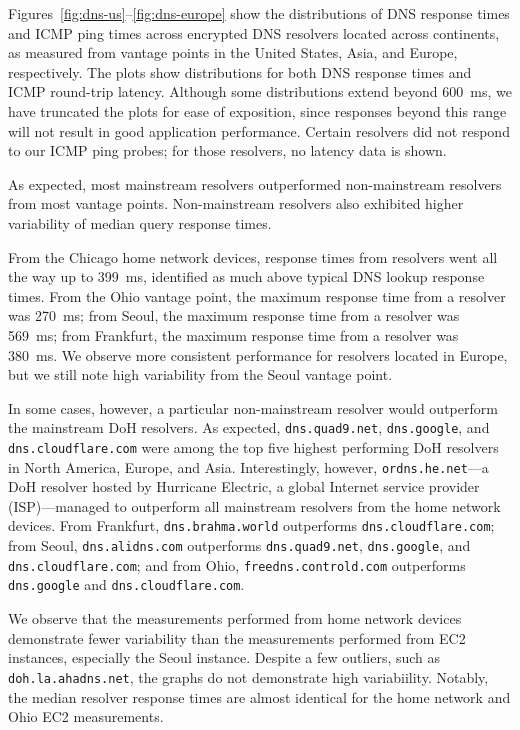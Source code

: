 Figures~\ref{fig:dns-us}--\ref{fig:dns-europe} show the distributions of DNS
response times and ICMP ping times across encrypted DNS resolvers located across continents, as measured
from vantage points in the United States, Asia, and Europe, respectively. The
plots show distributions for both DNS response times and ICMP round-trip latency. 
Although some distributions extend beyond 600~ms, we have truncated the plots
for ease of exposition, since responses beyond this range will not result in
good application performance.
Certain resolvers did not respond to our ICMP ping probes; for those
resolvers, no latency data is shown.


As expected, most mainstream resolvers outperformed non-mainstream resolvers
from most vantage points.
Non-mainstream resolvers also exhibited higher variability of 
median query response times.  

From the Chicago home network devices, response times from resolvers went all the way up to 
399~ms, identified as much above typical DNS lookup response times.
From the Ohio vantage point, the maximum response time from a resolver was 270~ms; from Seoul,
the maximum response time from a resolver was 569~ms; from Frankfurt, the maximum response time from a resolver was 380~ms. 
We observe more consistent performance for resolvers located in Europe, but we still 
note high variability from the Seoul vantage point. 

In some cases, however, a particular non-mainstream resolver would outperform
the mainstream DoH resolvers.  As expected, \texttt{dns.quad9.net},
\texttt{dns.google}, and \texttt{dns.cloudflare.com} were among the top five
highest performing DoH resolvers in North America, Europe, and Asia.
Interestingly, however, \texttt{ordns.he.net}---a DoH resolver hosted by
Hurricane Electric, a global Internet service provider (ISP)---managed to
outperform all mainstream resolvers from the home network devices. From Frankfurt, \texttt{dns.brahma.world}
outperforms \texttt{dns.cloudflare.com}; from Seoul, \texttt{dns.alidns.com} outperforms \texttt{dns.quad9.net},
\texttt{dns.google}, and \texttt{dns.cloudflare.com}; and from Ohio, \texttt{freedns.controld.com} outperforms \texttt{dns.google}
and \texttt{dns.cloudflare.com}.

We observe that the measurements performed from home network devices 
demonstrate fewer variability than the measurements performed from EC2 instances, 
especially the Seoul instance. Despite a few outliers, such as \texttt{doh.la.ahadns.net}, 
the graphs do not demonstrate high variabiility. Notably, the median resolver response 
times are almost identical for the home network and Ohio EC2 measurements. 


